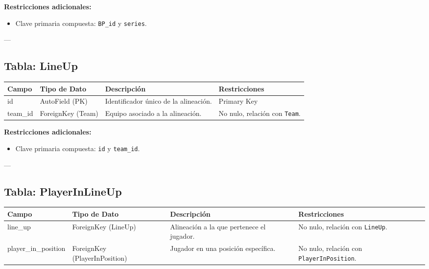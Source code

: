 \documentclass{report}
\begin{document}
    \textbf{Restricciones adicionales:}
    \begin{itemize}
        \item Clave primaria compuesta: \texttt{BP\_id} y \texttt{series}.
    \end{itemize}
    
    ---
    
    \subsection*{Tabla: LineUp}
    \begin{tabular}{|>{\raggedright\arraybackslash}p{3cm}|>{\raggedright\arraybackslash}p{3cm}|>{\raggedright\arraybackslash}p{6cm}|>{\raggedright\arraybackslash}p{4cm}|}
        \hline
        \textbf{Campo} & \textbf{Tipo de Dato} & \textbf{Descripción} & \textbf{Restricciones} \\
        \hline
        id & AutoField (PK) & Identificador único de la alineación. & Primary Key \\
        \hline
        team\_id & ForeignKey (Team) & Equipo asociado a la alineación. & No nulo, relación con \texttt{Team}. \\
        \hline
    \end{tabular}
    
    \textbf{Restricciones adicionales:}
    \begin{itemize}
        \item Clave primaria compuesta: \texttt{id} y \texttt{team\_id}.
    \end{itemize}
    
    ---
    
    \subsection*{Tabla: PlayerInLineUp}
    \begin{tabular}{|>{\raggedright\arraybackslash}p{3cm}|>{\raggedright\arraybackslash}p{3cm}|>{\raggedright\arraybackslash}p{6cm}|>{\raggedright\arraybackslash}p{4cm}|}
        \hline
        \textbf{Campo} & \textbf{Tipo de Dato} & \textbf{Descripción} & \textbf{Restricciones} \\
        \hline
        line\_up & ForeignKey (LineUp) & Alineación a la que pertenece el jugador. & No nulo, relación con \texttt{LineUp}. \\
        \hline
        player\_in\_position & ForeignKey (PlayerInPosition) & Jugador en una posición específica. & No nulo, relación con \texttt{PlayerInPosition}. \\
        \hline
    \end{tabular}
    
\end{document}
